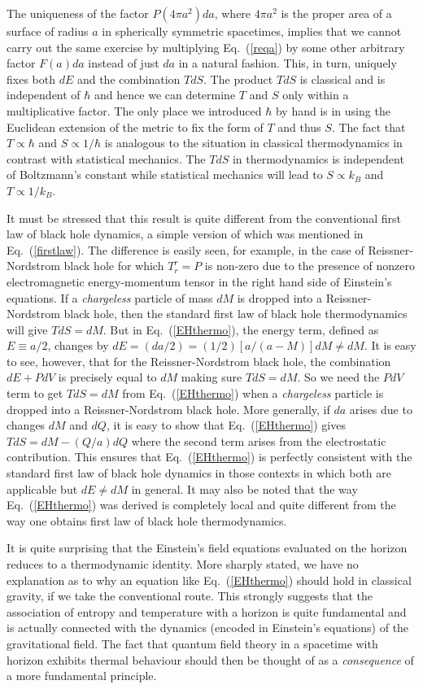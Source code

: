 \documentclass[12pt]{iopart}
\def\eq#1{{Eq.~(\ref{#1})}}
\begin{document}
  
The uniqueness of the factor $P(4\pi a^2) da$, where $4\pi a^2$ is the 
proper area of a surface of radius $a$ in spherically symmetric spacetimes, 
implies that we cannot carry out the same exercise by multiplying \eq{reqa} by   some other arbitrary factor 
$F(a) da$ instead of just $da$ in a natural fashion. This, in turn, uniquely fixes both $dE$ and the 
combination $TdS$. The product $TdS$ is  classical and is independent of $\hbar$ and hence we can  determine $T$ and $S$ only within
a multiplicative factor. The only place we introduced $\hbar$ by hand is in
 using the Euclidean extension of the metric to fix the form of $T$ and thus $S$.  
  The fact that $T\propto \hbar$ and $S\propto 1/\hbar$ is  analogous to the situation in classical thermodynamics  in contrast with statistical mechanics. The $TdS$ in thermodynamics is independent of Boltzmann's constant while statistical mechanics will lead to  $S\propto k_B$ and $T\propto 1/k_B$.

It must be stressed that this result is quite different from the conventional first law of black hole dynamics, a simple version of which was mentioned in \eq{firstlaw}. 
The difference  is easily seen, for example,
in the case of Reissner-Nordstrom black hole for which $T^r_r = P$ is non-zero due to the presence of nonzero electromagnetic energy-momentum tensor in the right hand 
side of Einstein's equations. If a
\textit{chargeless} particle of mass $dM$ is dropped into a
Reissner-Nordstrom black hole, then 
the standard first law of black hole thermodynamics 
 will give $TdS=dM$. But in \eq{EHthermo}, the energy term,
defined as  $E\equiv a/2$, changes by $dE= (da/2)
=(1/2)[a/(a-M)]dM\neq dM$. 
 It is easy to see, however, that for the Reissner-Nordstrom black hole, the combination 
 $dE+PdV$  is precisely
equal to $dM$ making sure $TdS=dM$. So we need the $PdV$ term to get
$TdS=dM$ from \eq{EHthermo}  when a \textit{chargeless} particle is dropped into a
Reissner-Nordstrom black hole. More generally, if $da$ arises due to
changes $dM$ and $dQ$, it is easy to show  that \eq{EHthermo} gives
$TdS=dM -(Q/a)dQ$ where the second term arises from the electrostatic
contribution. 
This ensures that \eq{EHthermo} is perfectly consistent
with the standard first law of black hole dynamics in those contexts
in which both are applicable but  $dE \ne dM$ in general.
It may also be noted that   the way 
\eq{EHthermo}
was derived is completely local and quite different from the way one obtains
first law of black hole thermodynamics. 
 
 
 It is quite surprising that the Einstein's field equations evaluated on the horizon reduces to a thermodynamic identity. More sharply stated, we have no explanation as to why an equation like \eq{EHthermo} should hold in classical gravity, if we take the conventional route. This strongly suggests that the association of entropy and temperature with a horizon
is quite fundamental and is actually connected with the dynamics (encoded in Einstein's equations)
of the gravitational field. The fact that quantum field theory in a spacetime
with horizon exhibits thermal behaviour should then be thought of as a \textit{consequence} 
of a more fundamental principle. 
\end{document}
